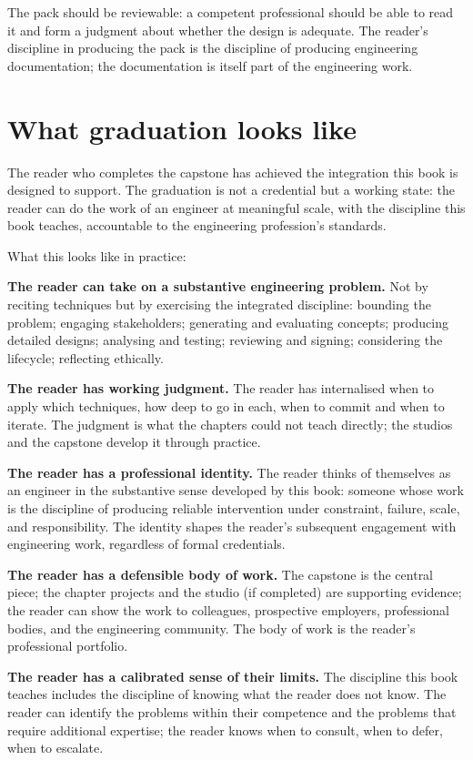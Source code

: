 The pack should be reviewable: a competent professional should be able to read it and form a judgment about whether the design is adequate. The reader's discipline in producing the pack is the discipline of producing engineering documentation; the documentation is itself part of the engineering work.

\section{What graduation looks like}

The reader who completes the capstone has achieved the integration this book is designed to support. The graduation is not a credential but a working state: the reader can do the work of an engineer at meaningful scale, with the discipline this book teaches, accountable to the engineering profession's standards.

What this looks like in practice:

\textbf{The reader can take on a substantive engineering problem.} Not by reciting techniques but by exercising the integrated discipline: bounding the problem; engaging stakeholders; generating and evaluating concepts; producing detailed designs; analysing and testing; reviewing and signing; considering the lifecycle; reflecting ethically.

\textbf{The reader has working judgment.} The reader has internalised when to apply which techniques, how deep to go in each, when to commit and when to iterate. The judgment is what the chapters could not teach directly; the studios and the capstone develop it through practice.

\textbf{The reader has a professional identity.} The reader thinks of themselves as an engineer in the substantive sense developed by this book: someone whose work is the discipline of producing reliable intervention under constraint, failure, scale, and responsibility. The identity shapes the reader's subsequent engagement with engineering work, regardless of formal credentials.

\textbf{The reader has a defensible body of work.} The capstone is the central piece; the chapter projects and the studio (if completed) are supporting evidence; the reader can show the work to colleagues, prospective employers, professional bodies, and the engineering community. The body of work is the reader's professional portfolio.

\textbf{The reader has a calibrated sense of their limits.} The discipline this book teaches includes the discipline of knowing what the reader does not know. The reader can identify the problems within their competence and the problems that require additional expertise; the reader knows when to consult, when to defer, when to escalate.

